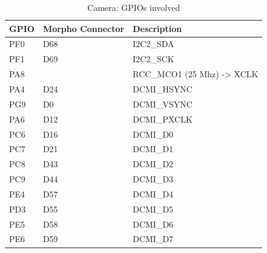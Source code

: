 \begin{table}[H]
\centering
\begin{tabular}{p{}p{}p{}}

\textbf{GPIO}&\textbf{Morpho Connector}&\textbf{Description}\\ \hline
PF0 & D68 & I2C2\_SDA\\ 
PF1 & D69 & I2C2\_SCK\\ 
PA8 &     & RCC\_MCO1 (25 Mhz) -> XCLK\\
PA4 & D24 & DCMI\_HSYNC\\
PG9 & D0  & DCMI\_VSYNC\\
PA6 & D12 & DCMI\_PXCLK\\
PC6 & D16 & DCMI\_D0\\
PC7 & D21 & DCMI\_D1\\
PC8 & D43 & DCMI\_D2\\
PC9 & D44 & DCMI\_D3\\
PE4 & D57 & DCMI\_D4\\
PD3 & D55 & DCMI\_D5\\
PE5 & D58 & DCMI\_D6\\
PE6 & D59 & DCMI\_D7\\
\hline
\end{tabular}
\caption{Camera: GPIOs involved}
\end{table}